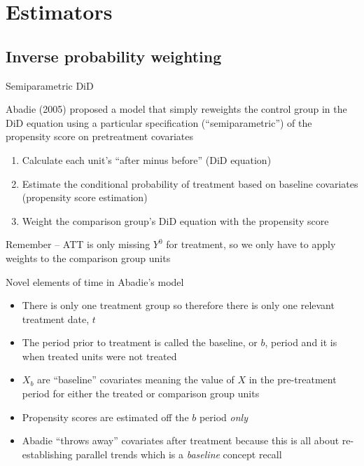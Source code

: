 \documentclass{beamer}
\begin{document}
\section{Estimators}

\subsection{Inverse probability weighting}




\begin{frame}{Semiparametric DiD}


 Abadie (2005) proposed a model that simply reweights the control group in the DiD equation using a particular specification (``semiparametric'') of the propensity score on pretreatment covariates
 
	\begin{enumerate}
	\item Calculate each unit's ``after minus before'' (DiD equation)
	\item Estimate the conditional probability of treatment based on baseline covariates (propensity score estimation)
	\item Weight the comparison group's DiD equation with the propensity score 
	\end{enumerate}

Remember -- ATT is only missing $Y^0$ for treatment, so we only have to apply weights to the comparison group units

\end{frame}

\begin{frame}{Novel elements of time in Abadie's model}

\begin{itemize}
\item There is only one treatment group so therefore there is only one relevant treatment date, $t$
\item The period prior to treatment is called the baseline, or $b$, period and it is when treated units were not treated 
\item $X_b$ are ``baseline'' covariates meaning the value of $X$ in the pre-treatment period for either the treated or comparison group units
\item Propensity scores are estimated off the $b$ period \emph{only} 
\item Abadie ``throws away'' covariates after treatment because this is all about re-establishing parallel trends which is a \emph{baseline} concept recall
\end{itemize}

\end{frame}
\end{document}

